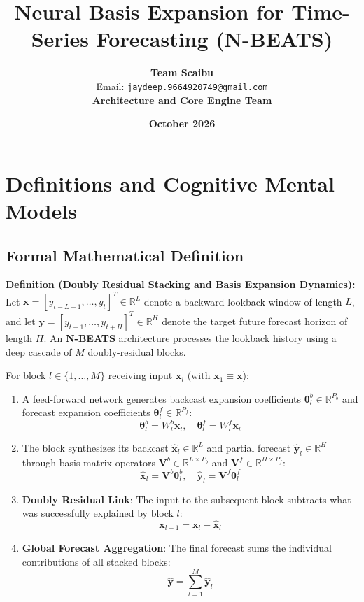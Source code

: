 \documentclass[11pt,a4paper]{article}
\title{\textbf{Neural Basis Expansion for Time-Series Forecasting (N-BEATS)}}
\author{\textbf{Team Scaibu} \\ \small Email: \texttt{jaydeep.9664920749@gmail.com} \\ \small \textbf{Architecture and Core Engine Team}}
\date{\textbf{October 2026}}
\theoremstyle{definition}
\begin{document}
\maketitle

\section{Definitions and Cognitive Mental Models}

\subsection{Formal Mathematical Definition}
\textbf{Definition (Doubly Residual Stacking and Basis Expansion Dynamics):}
Let $\mathbf{x} = [y_{t-L+1}, \dots, y_t]^T \in \mathbb{R}^L$ denote a backward lookback window of length $L$, and let $\mathbf{y} = [y_{t+1}, \dots, y_{t+H}]^T \in \mathbb{R}^H$ denote the target future forecast horizon of length $H$. An \textbf{N-BEATS} architecture processes the lookback history using a deep cascade of $M$ doubly-residual blocks.

For block $l \in \{1, \dots, M\}$ receiving input $\mathbf{x}_l$ (with $\mathbf{x}_1 \equiv \mathbf{x}$):
\begin{enumerate}
    \item A feed-forward network generates backcast expansion coefficients $\boldsymbol{\theta}_l^b \in \mathbb{R}^{P_b}$ and forecast expansion coefficients $\boldsymbol{\theta}_l^f \in \mathbb{R}^{P_f}$:
    {\boldmath
    \begin{equation}
    \boldsymbol{\theta}_l^b = W_l^b \mathbf{x}_l, \quad \boldsymbol{\theta}_l^f = W_l^f \mathbf{x}_l
    \end{equation}
    }
    \item The block synthesizes its backcast $\widehat{\mathbf{x}}_l \in \mathbb{R}^L$ and partial forecast $\widehat{\mathbf{y}}_l \in \mathbb{R}^H$ through basis matrix operators $\mathbf{V}^b \in \mathbb{R}^{L \times P_b}$ and $\mathbf{V}^f \in \mathbb{R}^{H \times P_f}$:
    {\boldmath
    \begin{equation}
    \widehat{\mathbf{x}}_l = \mathbf{V}^b \boldsymbol{\theta}_l^b, \quad \widehat{\mathbf{y}}_l = \mathbf{V}^f \boldsymbol{\theta}_l^f
    \end{equation}
    }
    \item \textbf{Doubly Residual Link}: The input to the subsequent block subtracts what was successfully explained by block $l$:
    {\boldmath
    \begin{equation}
    \mathbf{x}_{l+1} = \mathbf{x}_l - \widehat{\mathbf{x}}_l
    \end{equation}
    }
    \item \textbf{Global Forecast Aggregation}: The final forecast sums the individual contributions of all stacked blocks:
    {\boldmath
    \begin{equation}
    \widehat{\mathbf{y}} = \sum_{l=1}^M \widehat{\mathbf{y}}_l
    \end{equation}
    }
\end{enumerate}
\end{document}
